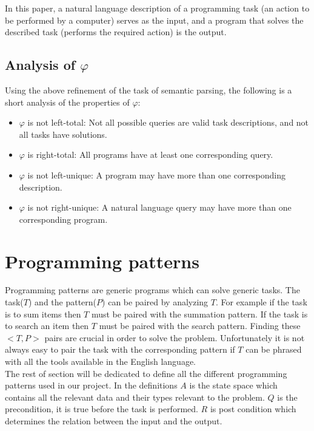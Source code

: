 \documentclass[12pt]{article}
\begin{document}
In this paper, a natural language description of a programming task (an action to be performed by a computer) serves as the input, and a program that solves the described task (performs the required action) is the output.

\subsection{Analysis of $\varphi$}

Using the above refinement of the task of semantic parsing, the following is a short analysis of the properties of $\varphi$:

\begin{itemize}[noitemsep]
	\item $\varphi$ is not left-total: Not all possible queries are valid task descriptions, and not all tasks have solutions.
	\item $\varphi$ is right-total: All programs have at least one corresponding query.
	\item $\varphi$ is not left-unique: A program may have more than one corresponding description.
	\item $\varphi$ is not right-unique: A natural language query may have more than one corresponding program.
\end{itemize}

\section{Programming patterns}\label{sec:pattern}
    Programming patterns are generic programs which can solve generic tasks. The task($T$) and the pattern($P$) can be paired by analyzing $T$. For example if the task is to sum items then $T$ must be paired with the summation pattern. If the task is to search an item then $T$ must be paired with the search pattern. Finding these $<T,P>$ pairs are crucial in order to solve the problem. Unfortunately it is not always easy to pair the task with the corresponding pattern if $T$ can be phrased with all the tools available in the English language.\\
    The rest of section will be dedicated to define all the different programming patterns used in our project. In the definitions $A$ is the state space which contains all the relevant data and their types relevant to the problem. $Q$ is the precondition, it is true before the task is performed. $R$ is post condition which determines the relation between the input and the output.
    
\end{document}
